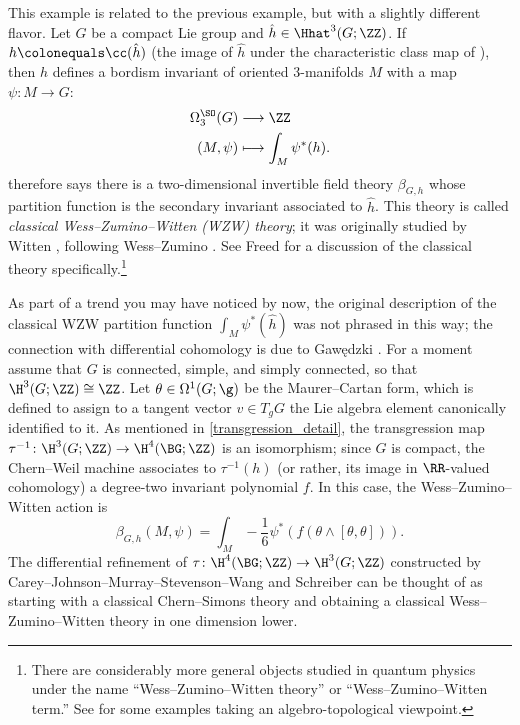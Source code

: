 \begin{example}\label{ex-WZW}
	This example is related to the previous example, but with a slightly different flavor. Let $G$ be a compact Lie
	group and $\hat h\in \Hhat^3(G;\ZZ)$. If $h \colonequals \cc(\hat{h})$ (the image of $\hat{h}$ under the characteristic class map of ),
	then $h$ defines a bordism invariant of oriented $3$-manifolds $M$ with a map $\psi\colon M\to G$:
	\begin{equation}
	\begin{aligned}
		\Omega_3^{\SO}(G) &\longrightarrow \ZZ\\
		(M,\psi) &\longmapsto\int_M \psi^*(h).
	\end{aligned}
	\end{equation}
	 therefore says there is a two-dimensional invertible field theory $\beta_{G, h}$ whose
	partition function is the secondary invariant associated to $\hat h$. This theory is called \textit{classical
	Wess--Zumino--Witten (WZW) theory}; it was originally studied by Witten \cite{Wit83}, following
	Wess--Zumino \cite{WZ71}. See Freed \cite[Appendix A]{Fre95} for a discussion of the classical theory
	specifically.\footnote{There are considerably more general objects studied in quantum physics under the name
	``Wess--Zumino--Witten theory'' or ``Wess--Zumino--Witten term.'' See \cites[\S 6]{DF99}{Fre08}[\S
	5.6]{Urs}{FSS15b}{LOT20}{Yon20} for some examples taking an algebro-topological viewpoint.}%

	As part of a trend you may have noticed by now, the original description of the classical WZW partition function
	$\int_M \psi^*(\hat h)$ was not phrased in this way; the connection with differential cohomology is due to
	Gawędzki \cite{Gaw88}. For a moment assume that $G$ is connected, simple, and simply connected, so that
	$\H^3(G;\ZZ)\cong\ZZ$. Let $\theta\in\Omega^1(G; \g)$ be the Maurer--Cartan form,
	which is defined to assign to a tangent vector $v\in T_gG$ the Lie algebra element canonically identified to it. As
	mentioned in \cref{transgression_detail}, the transgression map $\tau^{-1}\colon \H^3(G;\ZZ)\to \H^4(\BG;\ZZ)$ is
	an isomorphism; since $G$ is compact, the Chern--Weil machine associates to $\tau^{-1}(h)$ (or rather, its image in
	$\RR$-valued cohomology) a degree-two invariant polynomial $f$. In this case, the Wess--Zumino--Witten action is%
	\begin{equation}
		\beta_{G,h}(M, \psi) = \int_M -\frac 16\psi^*(f(\theta\wedge [\theta, \theta])).
	\end{equation}
	The differential refinement of $\tau\colon \H^4(\BG;\ZZ)\to\H^3(G;\ZZ)$ constructed by
	Carey--Johnson--Mur\-ray--Stevenson--Wang \cite[\S 3]{CJMSW05} and Schreiber \cite[1.4.1.2]{Urs} can be thought of as
	starting with a classical Chern--Simons theory and obtaining a classical Wess--Zumino--Witten theory in one
	dimension lower.
\end{example}

